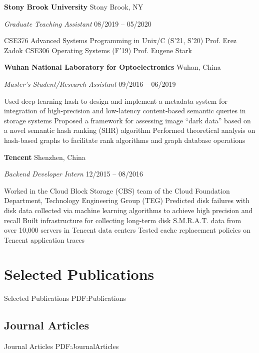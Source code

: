 \documentclass[letterpaper,10pt,oneside]{article}
\begin{document}
\begin{body}
\BigGap
{\textbf{Stony Brook University}}
\hfill
Stony Brook, NY

\emph{Graduate Teaching Assistant}
\hfill
08/2019 --
05/2020

\GapNoBreak
\BulletItem
CSE376 Advanced Systems Programming in Unix/C (S'21, S'20) Prof. Erez Zadok
\GapNoBreak
\BulletItem
CSE306 Operating Systems (F'19) Prof. Eugene Stark

\BigGap
{\textbf{Wuhan National Laboratory for Optoelectronics}}
\hfill
Wuhan, China

\emph{Master's Student/Research Assistant}
\hfill
09/2016 --
06/2019

\GapNoBreak
\BulletItem
Used deep learning hash to design and implement a metadata system for integration of high-precision and low-latency content-based semantic queries in storage systems
\GapNoBreak
\BulletItem
Proposed a framework for assessing image ``dark data'' based on a novel semantic hash ranking (SHR) algorithm
\GapNoBreak
\BulletItem
Performed theoretical analysis on hash-based graphs to facilitate rank algorithms and graph database operations

\BigGap
{\textbf{Tencent}} 
\hfill
Shenzhen, China

\emph{Backend Developer Intern}
\hfill
12/2015 --
08/2016

\GapNoBreak
\BulletItem
Worked in the Cloud Block Storage (CBS) team of the Cloud Foundation Department, Technology Engineering Group (TEG)
\GapNoBreak
\BulletItem
Predicted disk failures with disk data collected via machine learning algorithms to achieve high precision and recall
\GapNoBreak
\BulletItem
Built infrastructure for collecting long-term disk S.M.R.A.T. data from over 10,000 servers in Tencent data centers
\GapNoBreak
\BulletItem
Tested cache replacement policies on Tencent application traces


\section
{Selected Publications}
{Selected Publications}
{PDF:Publications}

\subsection
{Journal Articles}
{Journal Articles}
{PDF:JournalArticles}


\end{body}
\end{document}
